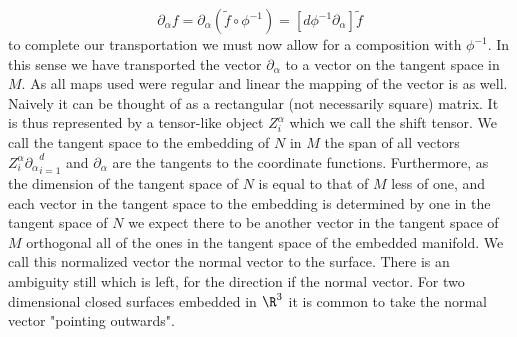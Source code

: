 \documentclass[../main.tex]{subfiles}
\begin{document}
        \begin{equation}
            \partial_\alpha f = \partial_\alpha (\tilde{f}\circ\phi^{-1}) = \left[d\phi^{-1}\partial_\alpha\right]\tilde{f}
        \end{equation}
        to complete our transportation we must now allow for a composition with $\phi^{-1}$. In this sense we have transported the vector $\partial_\alpha$ to a vector on the tangent space in $M$. As all maps used were regular and linear the mapping of the vector is as well. Naively it can be thought of as a rectangular (not necessarily square) matrix. It is thus represented by a tensor-like object $Z_i^\alpha$ which we call the shift tensor. We call the tangent space to the embedding of $N$ in $M$ the span of all vectors ${Z^\alpha_i\partial_\alpha}_{i=1}^{d}$ and $\partial_\alpha$ are the tangents to the coordinate functions. Furthermore, as the dimension of the tangent space of $N$ is equal to that of $M$ less of one, and each vector in the tangent space to the embedding is determined by one in the tangent space of $N$ we expect there to be another vector in the tangent space of $M$ orthogonal all of the ones in the tangent space of the embedded manifold. We call this normalized vector the normal vector to the surface. There is an ambiguity still which is left, for the direction if the normal vector. For two dimensional closed surfaces embedded in $\R^3$ it is common to take the normal vector "pointing outwards".
        
\end{document}
